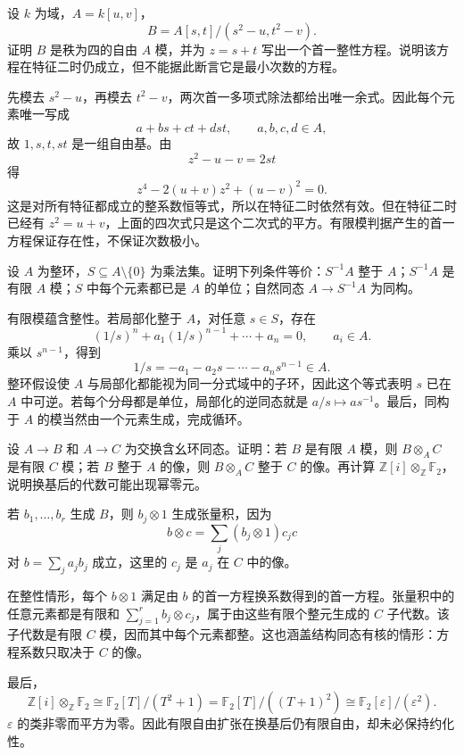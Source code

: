 \begin{exercise}\label{g5:ex:integral-two-square-roots}
	设 \(k\) 为域，\(A=k[u,v]\)，
	\[
		B=A[s,t]/(s^2-u,t^2-v).
	\]
	证明 \(B\) 是秩为四的自由 \(A\) 模，并为 \(z=s+t\) 写出一个首一整性方程。说明该方程在特征二时仍成立，但不能据此断言它是最小次数的方程。
\end{exercise}
\begin{solution}
	先模去 \(s^2-u\)，再模去 \(t^2-v\)，两次首一多项式除法都给出唯一余式。因此每个元素唯一写成
	\[
		a+bs+ct+dst,\qquad a,b,c,d\in A,
	\]
	故 \(1,s,t,st\) 是一组自由基。由
	\[
		z^2-u-v=2st
	\]
	得
	\[
		z^4-2(u+v)z^2+(u-v)^2=0.
	\]
	这是对所有特征都成立的整系数恒等式，所以在特征二时依然有效。但在特征二时已经有 \(z^2=u+v\)，上面的四次式只是这个二次式的平方。有限模判据产生的首一方程保证存在性，不保证次数极小。
\end{solution}

\begin{exercise}\label{g5:ex:integral-localization-units}
	设 \(A\) 为整环，\(S\subseteq A\setminus\{0\}\) 为乘法集。证明下列条件等价：\(S^{-1}A\) 整于 \(A\)；\(S^{-1}A\) 是有限 \(A\) 模；\(S\) 中每个元素都已是 \(A\) 的单位；自然同态 \(A\to S^{-1}A\) 为同构。
\end{exercise}
\begin{solution}
	有限模蕴含整性。若局部化整于 \(A\)，对任意 \(s\in S\)，存在
	\[
		(1/s)^n+a_1(1/s)^{n-1}+\cdots+a_n=0,\qquad a_i\in A.
	\]
	乘以 \(s^{n-1}\)，得到
	\[
		1/s=-a_1-a_2s-\cdots-a_ns^{n-1}\in A.
	\]
	整环假设使 \(A\) 与局部化都能视为同一分式域中的子环，因此这个等式表明 \(s\) 已在 \(A\) 中可逆。若每个分母都是单位，局部化的逆同态就是 \(a/s\mapsto as^{-1}\)。最后，同构于 \(A\) 的模当然由一个元素生成，完成循环。
\end{solution}

\begin{exercise}\label{g5:ex:integral-base-change}
	设 \(A\to B\) 和 \(A\to C\) 为交换含幺环同态。证明：若 \(B\) 是有限 \(A\) 模，则 \(B\otimes_A C\) 是有限 \(C\) 模；若 \(B\) 整于 \(A\) 的像，则 \(B\otimes_A C\) 整于 \(C\) 的像。再计算
	\(\mathbb Z[i]\otimes_{\mathbb Z}\mathbb F_2\)，说明换基后的代数可能出现幂零元。
\end{exercise}
\begin{solution}
	若 \(b_1,\ldots,b_r\) 生成 \(B\)，则 \(b_j\otimes1\) 生成张量积，因为
	\[
		b\otimes c=\sum_j(b_j\otimes1)c_jc
	\]
	对 \(b=\sum_j a_jb_j\) 成立，这里的 \(c_j\) 是 \(a_j\) 在 \(C\) 中的像。

	在整性情形，每个 \(b\otimes1\) 满足由 \(b\) 的首一方程换系数得到的首一方程。张量积中的任意元素都是有限和 \(\sum_{j=1}^r b_j\otimes c_j\)，属于由这些有限个整元生成的 \(C\) 子代数。该子代数是有限 \(C\) 模，因而其中每个元素都整。这也涵盖结构同态有核的情形：方程系数只取决于 \(C\) 的像。

	最后，
	\[
		\mathbb Z[i]\otimes_{\mathbb Z}\mathbb F_2
		\cong\mathbb F_2[T]/(T^2+1)
		=\mathbb F_2[T]/((T+1)^2)
		\cong\mathbb F_2[\varepsilon]/(\varepsilon^2).
	\]
	\(\varepsilon\) 的类非零而平方为零。因此有限自由扩张在换基后仍有限自由，却未必保持约化性。
\end{solution}

